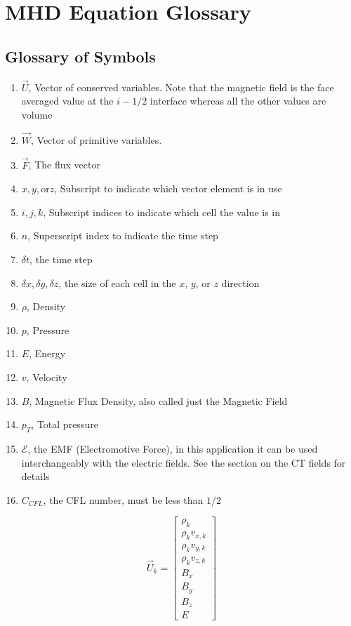 \section{MHD Equation Glossary}
\label{sec:mhd-glossary}

\subsection*{Glossary of Symbols}

\begin{enumerate}
    \item $ \vec{U} $, Vector of conserved variables. Note that the magnetic field is the face averaged value at the $ i-1/2 $ interface whereas all the other values are volume
    \item $ \vec{W} $, Vector of primitive variables.
    \item $ \vec{F} $, The flux vector
    \item $ x, y, \text{or} z $, Subscript to indicate which vector element is in use
    \item $ i, j, k $, Subscript indices to indicate which cell the value is in
    \item $ n $, Superscript index to indicate the time step
    \item $ \delta t $, the time step
    \item $ \delta x, \delta y, \delta z $, the size of each cell in the $x$, $y$, or $z$ direction
    \item $\rho  $, Density
    \item $p  $, Pressure
    \item $E $, Energy
    \item $v  $, Velocity
    \item $B $, Magnetic Flux Density, also called just the Magnetic Field
    \item $p_T $, Total pressure
    \item $ \mathcal{E} $, the EMF (Electromotive Force), in this application it can be used interchangeably with the electric fields. See the section on the CT fields for details
    \item $ C_{CFL} $, the CFL number, must be less than $1/2$
\end{enumerate}


\begin{equation}
    \vec{U}_k = \begin{bmatrix}
            \rho_k \\
            \rho_k v_{x,k} \\
            \rho_k v_{y,k} \\
            \rho_k v_{z,k} \\
            B_x \\
            B_y \\
            B_z \\
            E
         \end{bmatrix}
\end{equation}

